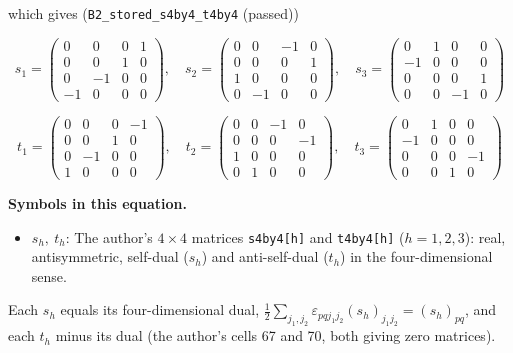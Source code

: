 \documentclass[
  10pt,
]{article}
\providecommand{\tightlist}{%
  \setlength{\itemsep}{0pt}\setlength{\parskip}{0pt}}
\begin{document}
which gives (\texttt{B2\_stored\_s4by4\_t4by4} (passed))

\[
s_1 = \begin{pmatrix} 0 & 0 & 0 & 1 \\ 0 & 0 & 1 & 0 \\ 0 & -1 & 0 & 0 \\ -1 & 0 & 0 & 0 \end{pmatrix},\quad s_2 = \begin{pmatrix} 0 & 0 & -1 & 0 \\ 0 & 0 & 0 & 1 \\ 1 & 0 & 0 & 0 \\ 0 & -1 & 0 & 0 \end{pmatrix},\quad s_3 = \begin{pmatrix} 0 & 1 & 0 & 0 \\ -1 & 0 & 0 & 0 \\ 0 & 0 & 0 & 1 \\ 0 & 0 & -1 & 0 \end{pmatrix}
\]

\[
t_1 = \begin{pmatrix} 0 & 0 & 0 & -1 \\ 0 & 0 & 1 & 0 \\ 0 & -1 & 0 & 0 \\ 1 & 0 & 0 & 0 \end{pmatrix},\quad t_2 = \begin{pmatrix} 0 & 0 & -1 & 0 \\ 0 & 0 & 0 & -1 \\ 1 & 0 & 0 & 0 \\ 0 & 1 & 0 & 0 \end{pmatrix},\quad t_3 = \begin{pmatrix} 0 & 1 & 0 & 0 \\ -1 & 0 & 0 & 0 \\ 0 & 0 & 0 & -1 \\ 0 & 0 & 1 & 0 \end{pmatrix}
\]

\textbf{Symbols in this equation.}

\begin{itemize}
\tightlist
\item
  \(s_h,\ t_h\): The author's \(4 \times 4\) matrices
  \texttt{s4by4{[}h{]}} and \texttt{t4by4{[}h{]}} (\(h = 1, 2, 3\)):
  real, antisymmetric, self-dual (\(s_h\)) and anti-self-dual (\(t_h\))
  in the four-dimensional sense.
\end{itemize}

Each \(s_h\) equals its four-dimensional dual,
\(\tfrac12\sum_{j_1, j_2}\varepsilon_{pqj_1j_2}(s_h)_{j_1j_2} = (s_h)_{pq}\),
and each \(t_h\) minus its dual (the author's cells 67 and 70, both
giving zero matrices).
\end{document}
